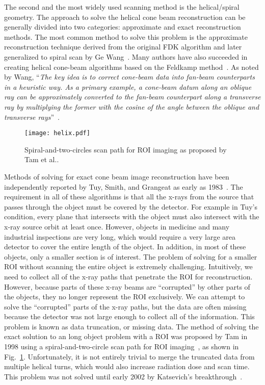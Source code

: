 The second and the most widely used scanning method is the helical/spiral geometry.  The approach to solve the helical cone beam reconstruction can be generally divided into two categories: approximate and exact reconstruction methods.  The most common method to solve this problem is the approximate reconstruction technique derived from the original FDK algorithm and later generalized to spiral scan by Ge Wang~\citep{Wang1993}.  Many authors have also succeeded in creating helical cone-beam algorithms based on the Feldkamp method~\citep{Wang1992, Kudo1991, Yan1992, Smith1992, Noo1999, Kachelriess2000, Tang2004, Tang2006a, Tang2006b}.  As noted by Wang, ``\textit{The key idea is to correct cone-beam data into fan-beam counterparts in a heuristic way.  As a primary example, a cone-beam datum along an oblique ray can be approximately converted to the fan-beam counterpart along a transverse ray by multiplying the former with the cosine of the angle between the oblique and transverse rays}''~\citep{Wang2007}.
%
\begin{figure}[h]
\texttt{[image: helix.pdf]}
\caption{Spiral-and-two-circles scan path for ROI imaging as proposed by Tam et al..}
\label{fig:tam_circle}
\end{figure}
%
Methods of solving for exact cone beam image reconstruction have been independently reported by Tuy, Smith, and Grangeat as early as 1983~\citep{Tuy1983, Smith1985, Grangeat1991}.  The requirement in all of these algorithms is that all the x-rays from the source that passes through the object must be covered by the detector.  For example in Tuy's condition, every plane that intersects with the object must also intersect with the x-ray source orbit at least once.  However, objects in medicine and many industrial inspections are very long, which would require a very large area detector to cover the entire length of the object.  In addition, in most of these objects, only a smaller section is of interest.  The problem of solving for a smaller ROI without scanning the entire object is extremely challenging.  Intuitively, we need to collect all of the x-ray paths that penetrate the ROI for reconstruction.  However, because parts of these x-ray beams are ``corrupted'' by other parts of the objects, they no longer represent the ROI exclusively.  We can attempt to solve the ``corrupted'' parts of the x-ray paths, but the data are often missing because the detector was not large enough to collect all of the information.  This problem is known as data truncation, or missing data.  The method of solving the exact solution to an long object problem with a ROI was proposed by Tam in 1998 using a spiral-and-two-circle scan path for ROI imaging~\citep{Tam1998}, as shown in Fig.~\ref{fig:tam_circle}.  Unfortunately, it is not entirely trivial to merge the truncated data from multiple helical turns,  which would also increase radiation dose and scan time.  This problem was not solved until early 2002 by Katsevich's breakthrough~\citep{Katsevich2002SIAM, Katsevich2003, Katsevich2004}.
